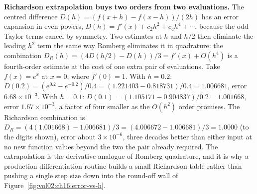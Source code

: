 \begin{example}
\textbf{Richardson extrapolation buys two orders from two evaluations.} The
centred difference $D(h) = (f(x+h) - f(x-h))/(2h)$ has an error expansion in
even powers, $D(h) = f'(x) + c_{2} h^{2} + c_{4} h^{4} + \cdots$, because the
odd Taylor terms cancel by symmetry. Two estimates at $h$ and $h/2$ then
eliminate the leading $h^{2}$ term the same way Romberg eliminates it in
quadrature: the combination $D_{R}(h) = (4 D(h/2) - D(h))/3 = f'(x) + O(h^{4})$
is a fourth-order estimate at the cost of one extra pair of evaluations. Take
$f(x) = e^{x}$ at $x = 0$, where $f'(0) = 1$. With $h = 0.2$: $D(0.2) =
(e^{0.2} - e^{-0.2})/0.4 = (1.221403 - 0.818731)/0.4 = 1.006681$, error
$6.68 \times 10^{-3}$. With $h = 0.1$: $D(0.1) = (1.105171 - 0.904837)/0.2 =
1.001668$, error $1.67 \times 10^{-3}$, a factor of four smaller as the
$O(h^{2})$ order promises. The Richardson combination is $D_{R} = (4(1.001668)
- 1.006681)/3 = (4.006672 - 1.006681)/3 = 1.0000$ (to the digits shown), error
about $3 \times 10^{-6}$, three decades better than either input at no new
function values beyond the two the pair already required. The extrapolation is
the derivative analogue of Romberg quadrature, and it is why a production
differentiation routine builds a small Richardson table rather than pushing a
single step size down into the round-off wall of
Figure~\ref{fig:vol02:ch16:error-vs-h}.
\end{example}

